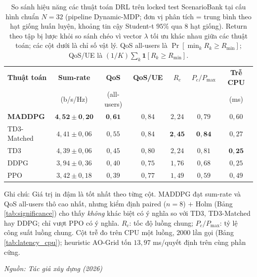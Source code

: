 \begin{table}[t]
\centering
\small
\caption{So sánh hiệu năng các thuật toán DRL trên locked test ScenarioBank tại cấu hình chuẩn $N=32$ (pipeline Dynamic-MDP; đơn vị phân tích = trung bình theo hạt giống huấn luyện, khoảng tin cậy Student-t $95\%$ qua $8$ hạt giống). Return theo tập bị lược khỏi so sánh chéo vì vector $\lambda$ tối ưu khác nhau giữa các thuật toán; các cột dưới là chỉ số vật lý. QoS all-users là $\Pr[\min_k R_k \ge R_{\min}]$; QoS/UE là $(1/K)\sum_k \mathbf{1}[R_k \ge R_{\min}]$.}
\label{tab:algorithm_comparison}
\setlength{\tabcolsep}{4pt}
\begin{tabular}{lcccccc}
\toprule
\textbf{Thuật toán} & \textbf{Sum-rate} & \textbf{QoS} & \textbf{QoS/UE} & \textbf{$R_c$} & \textbf{$P_c/P_{\max}$} & \textbf{Trễ CPU} \\
                    & (b/s/Hz)          & (all-users)   &                &                &                         & (ms)               \\
\midrule
\textbf{MADDPG} & $\mathbf{4{,}52 \pm 0{,}20}$ & $\mathbf{0{,}61}$ & $0{,}84$ & $2{,}24$ & $0{,}79$ & $0{,}60$ \\
TD3-Matched     & $4{,}41 \pm 0{,}06$         & $0{,}55$          & $0{,}84$ & $\mathbf{2{,}45}$ & $\mathbf{0{,}84}$ & $0{,}27$ \\
TD3             & $4{,}39 \pm 0{,}06$         & $0{,}45$          & $0{,}80$ & $2{,}24$ & $0{,}81$ & $\mathbf{0{,}25}$ \\
DDPG            & $3{,}94 \pm 0{,}36$         & $0{,}40$          & $0{,}75$ & $1{,}76$ & $0{,}68$ & $0{,}25$ \\
PPO             & $3{,}42 \pm 0{,}18$         & $0{,}39$          & $0{,}77$ & $1{,}49$ & $0{,}59$ & $0{,}49$ \\
\bottomrule
\end{tabular}

\vspace{0.2em}
{\footnotesize Ghi chú: Giá trị in đậm là tốt nhất theo từng cột. MADDPG đạt sum-rate và QoS all-users thô cao nhất, nhưng kiểm định paired ($n=8$) $+$ Holm (Bảng \ref{tab:significance}) cho thấy \emph{không} khác biệt có ý nghĩa so với TD3, TD3-Matched hay DDPG; chỉ vượt PPO có ý nghĩa. $R_c$: tốc độ luồng chung; $P_c/P_{\max}$: tỷ lệ công suất luồng chung. Cột trễ đo trên CPU một luồng, $2000$ lần gọi (Bảng \ref{tab:latency_cpu}); heuristic AO-Grid tốn $13{,}97$ ms/quyết định trên cùng phần cứng.\par}
\hfill {\footnotesize\itshape Nguồn: Tác giả xây dựng (2026)}
\end{table}
